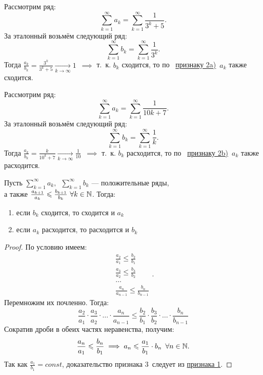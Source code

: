 \documentclass[../../main.tex]{subfiles}
\begin{document}
\begin{example}
	Рассмотрим ряд:
	\[
		 \sum\limits_{k = 1}^\infty a_k=  \sum\limits_{k = 1}^\infty\frac{1}{3^k + 5}
	.\]
	За эталонный возьмём следующий ряд:
	\[
		\sum\limits_{k = 1}^\infty b_k=   \sum\limits_{k = 1}^\infty\frac{1}{3^k}
	.\]
	Тогда $\frac{a_k}{b_k} = \frac{3^k}{3^k + 5} \xrightarrow[k \to \infty]{} 1$\ 
	$\implies$ т.~к. $b_k$ сходится, то по \  
	 \hyperref[lec26:comp_test_2]{признаку  2\textdegree a)}\ $a_k$ также сходится.
\end{example}
\begin{example}
	Рассмотрим ряд:
	\[
		 \sum\limits_{k = 1}^\infty a_k=  \sum\limits_{k = 1}^\infty\frac{1}{10k + 7}
	.\]
	За эталонный возьмём следующий ряд:
	\[
		\sum\limits_{k = 1}^\infty b_k=   \sum\limits_{k = 1}^\infty\frac{1}{k}
	.\]
	Тогда $\frac{a_k}{b_k} = \frac{k}{10^k + 7} \xrightarrow[k \to \infty]{} 
	\frac{1}{10}$\ 
	$\implies$ т.~к. $b_k$ расходится, то по \  
	 \hyperref[lec26:comp_test_2]{признаку  2\textdegree b)}\ 
	 $a_k$ также расходится.
\end{example}
\begin{thm}[Признак сравнения 3\textdegree]
 	\label{lec26:comp_test_3}
 	Пусть $\sum\limits_{k = 1}^\infty a_k,\enspace \sum\limits_{k = 1}^\infty b_k$
 	 --- положительные ряды,\\ 
 	а также $\frac{a_{k+1}}{a_k} \leq \frac{b_{k+1}}{b_k} \ 
 	\forall k \in \N$. Тогда:
	\begin{enumerate}[label={\alph*)}]
	\item если  $b_k$ сходится, то сходится и $a_k$
	\item если $a_k$ расходится, то расходится и $b_k$
	\end{enumerate}
\end{thm}
\begin{proof}
	По условию имеем:
 	\[
		\begin{array}{l}
			\frac{a_2}{a_1} \leq \frac{b_2}{b_1}\\
			\frac{a_3}{a_2} \leq \frac{b_3}{b_2}\\
			\dots\\
			\frac{a_n}{a_{n-1}} \leq \frac{b_n}{b_{n-1}}
		\end{array}		
	.\]
	Перемножим их почленно. Тогда:
	\[
		\frac{a_2}{a_1}\cdot\frac{a_3}{a_2}\cdot\ldots
		\cdot\frac{a_n}{a_{n-1}} \leq
		\frac{b_2}{b_1}\cdot\frac{b_3}{b_2}\cdot\ldots
		\cdot\frac{b_n}{b_{n-1}}
	\]
	Сократив дроби в обеих частях неравенства, получим:
	\[
		\frac{a_n}{a_1} \leqslant \frac{b_n}{b_1} \implies
		a_n \leqslant \frac{a_1}{b_1}\cdot b_n\enspace \forall n \in \mathbb{N}
	.\]
	Так как $ \frac{a_1}{b_1} = const$, 
	доказательство признака 3\textdegree \ следует из
	\hyperref[lec26:comp_test_1]{признака  1\textdegree}.
\end{proof}
\end{document}
